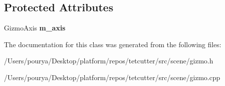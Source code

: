 \subsection*{Protected Attributes}
\begin{DoxyCompactItemize}
\item 
\hypertarget{classps_1_1scene_1_1GizmoInterface_a34badbe2f7a82833fcf6a0e6468c793c}{}Gizmo\+Axis {\bfseries m\+\_\+axis}\label{classps_1_1scene_1_1GizmoInterface_a34badbe2f7a82833fcf6a0e6468c793c}

\end{DoxyCompactItemize}


The documentation for this class was generated from the following files\+:\begin{DoxyCompactItemize}
\item 
/\+Users/pourya/\+Desktop/platform/repos/tetcutter/src/scene/gizmo.\+h\item 
/\+Users/pourya/\+Desktop/platform/repos/tetcutter/src/scene/gizmo.\+cpp\end{DoxyCompactItemize}
